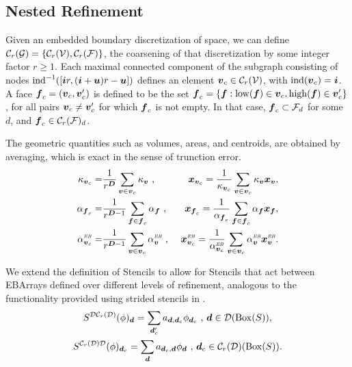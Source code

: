 \documentclass[12pt]{article}
\newcommand{\ind}{{\rm{ind}}}
\newcommand{\low}{{\rm{low}}}
\newcommand{\high}{{\rm{high}}}
\newcommand{\vof}{{\mbf{v}}}
\newcommand{\face}{{\mbf{f}}}
\newcommand{\dgen}{{\mbf{d}}}
\newcommand{\VC}{{\mcl{C}_r(\mcl{V})}}
\newcommand{\ebsub}{{\text{\it \tiny EB}}}
\begin{document}
\subsection{Nested Refinement} 

Given an embedded boundary discretization of space, we can define ${\mathcal{C}}_r({\mathcal{G}}) =\{ {\mathcal{C}}_r({\mathcal{V}}),{\mathcal{C}}_r({\mathcal{F}})\}$, the coarsening of that discretization by some integer factor $r \ge 1$. Each maximal connected component of the subgraph consisting of nodes $\ind^{-1}([\mbf{i} r , (\mbf{i} + \mbf{u})r - \mbf{u}] )$ defines an element $\vof_c \in \VC$, with $\ind(\vof_c) = \mbf{i}$. A face $\face_c = (\vof_c , \vof_c')$ is defined to be the set $\face_c = \{\face: \low(\face ) \in \vof_c , \high(\face) \in \vof_c'\}$, for all pairs $\vof_c \neq \vof_c'$ for which $\face_c$ is not empty. In that case, $\face_c \subset \mcl{F}_d$ for some $d$, and $\face_c \in \mcl{C}_r(\mcl{F})_d$.

The geometric quantities such as volumes, areas, and centroids, are obtained by averaging, which is exact in the sense of trunction error. 
\begin{align*}
\kappa_{\vof_c} = & \frac{1}{r^\DIM} \sum \limits_{\vof \in \vof_c} \kappa_\vof \cma &
\mbf{x}_{\vof_c} =  \frac{1}{\kappa_{\vof_c}} \sum \limits_{\vof \in \vof_c} \kappa_\vof \mbf{x}_\vof ,
\\
\alpha_{\face_c} = & \frac{1}{r^{\DIM-1}} \sum \limits_{\face \in \face_c} \alpha_\face \cma & \mbf{x}_{\face_c} =  \frac{1}{\alpha_{\face_c}} \sum \limits_{\face \in \face_c} \alpha_\face \mbf{x}_\face ,
\\
\alpha_{\vof_c}^\ebsub = & \frac{1}{r^{\DIM-1}} \sum \limits_{\vof \in \vof_c} \alpha_\vof^\ebsub \cma & \mbf{x}_{\vof_c}^\ebsub =  \frac{1}{\alpha_{\vof_c}^\ebsub} \sum \limits_{\vof \in \vof_c} \alpha_\vof^\ebsub \mbf{x}_\vof^\ebsub .
\end{align*}

We extend the definition of Stencils to allow for Stencils that act between EBArrays defined over different levels of refinement, analogous to the functionality provided using strided stencils in .
\begin{gather*}
S^{\mcl{D}\mcl{C}_r(\mcl{D})}(\phi)_{\dgen} =\sum \limits_{\dgen_c '} a_{\dgen,\dgen_c} \phi_{\dgen_c  } \cma \dgen \in \mcl{D}(\MBox(S)), 
\\ S^{\mcl{C}_r(\mcl{D}) \mcl{D}}(\phi)_{\dgen_c} = \sum \limits_{\dgen} a_{\dgen_c,\dgen} \phi_{\dgen } \cma \dgen_c \in \mcl{C}_r(\mcl{D})(\MBox(S)).
\end{gather*}
\end{document}
